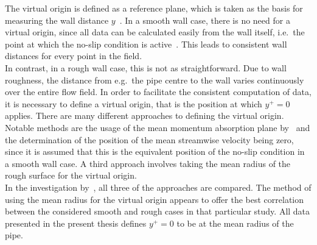 The virtual origin is defined as a reference plane, which is taken as the basis for measuring the wall distance $y$~\citep{chungPredictingDragRough2021}.
In a smooth wall case, there is no need for a virtual origin, since all data can be calculated easily from the wall itself, i.e.\ the point at which the no-slip condition is active~\citep{chanSystematicInvestigationRoughness2015}.
This leads to consistent wall distances for every point in the field.\\
In contrast, in a rough wall case, this is not as straightforward.
Due to wall roughness, the distance from e.g.\ the pipe centre to the wall varies continuously over the entire flow field.
In order to facilitate the consistent computation of data, it is necessary to define a virtual origin, that is the position at which $y^+ = 0$ applies. 
There are many different approaches to defining the virtual origin.
Notable methods are the usage of the mean momentum absorption plane by~\cite{thomMomentumAbsorptionVegetation1971} and the determination of the position of the mean streamwise velocity being zero, since it is assumed that this is the equivalent position of the no-slip condition in a smooth wall case.
A third approach involves taking the mean radius of the rough surface for the virtual origin.\\
In the investigation by~\cite{chanSystematicInvestigationRoughness2015}, all three of the approaches are compared. 
The method of using the mean radius for the virtual origin appears to offer the best correlation between the considered smooth and rough cases in that particular study.
All data presented in the present thesis defines $y^+ = 0$ to be at the mean radius of the pipe.

